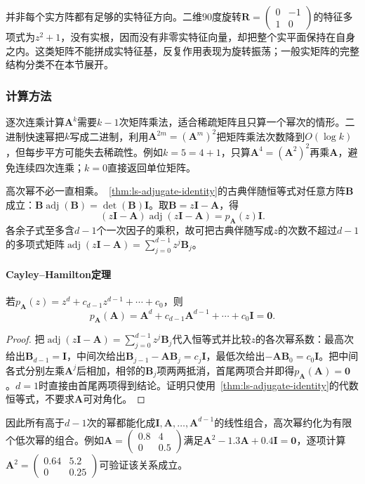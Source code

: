 并非每个实方阵都有足够的实特征方向。二维$90$度旋转$\bm R=\begin{pmatrix}0&-1\\1&0\end{pmatrix}$的特征多项式为$z^2+1$，没有实根，因而没有非零实特征向量，却把整个实平面保持在自身之内。这类矩阵不能拼成实特征基，反复作用表现为旋转振荡；一般实矩阵的完整结构分类不在本节展开。

\subsubsection{计算方法}

逐次连乘计算$\bm A^k$需要$k-1$次矩阵乘法，适合稀疏矩阵且只算一个幂次的情形。二进制快速幂把$k$写成二进制，利用$\bm A^{2m}=(\bm A^m)^2$把矩阵乘法次数降到$O(\log k)$，但每步平方可能失去稀疏性。例如$k=5=4+1$，只算$\bm A^4=(\bm A^2)^2$再乘$\bm A$，避免连续四次连乘；$k=0$直接返回单位矩阵。

高次幂不必一直相乘。~\ref{thm:ls-adjugate-identity}的古典伴随恒等式对任意方阵$\bm B$成立：$\bm B\operatorname{adj}(\bm B)=\det(\bm B)\bm I$。取$\bm B=z\bm I-\bm A$，得
\[
 (z\bm I-\bm A)\operatorname{adj}(z\bm I-\bm A)=p_{\bm A}(z)\bm I.
\]
各余子式至多含$d-1$个一次因子的乘积，故可把古典伴随写成$z$的次数不超过$d-1$的多项式矩阵$\operatorname{adj}(z\bm I-\bm A)=\sum_{j=0}^{d-1}z^j\bm B_j$。

\paragraph{Cayley--Hamilton定理}

\begin{theorem}
\label{thm:ls-cayley-hamilton}
若$p_{\bm A}(z)=z^d+c_{d-1}z^{d-1}+\cdots+c_0$，则
\[
 p_{\bm A}(\bm A)
 =\bm A^d+c_{d-1}\bm A^{d-1}+\cdots+c_0\bm I=\bm0.
\]
\end{theorem}
\begin{proof}
把$\operatorname{adj}(z\bm I-\bm A)=\sum_{j=0}^{d-1}z^j\bm B_j$代入恒等式并比较$z$的各次幂系数：最高次给出$\bm B_{d-1}=\bm I$，中间次给出$\bm B_{j-1}-\bm A\bm B_j=c_j\bm I$，最低次给出$-\bm A\bm B_0=c_0\bm I$。把中间各式分别左乘$\bm A^j$后相加，相邻的$\bm B_j$项两两抵消，首尾两项合并即得$p_{\bm A}(\bm A)=\bm0$。$d=1$时直接由首尾两项得到结论。证明只使用~\ref{thm:ls-adjugate-identity}的代数恒等式，不要求$\bm A$可对角化。
\end{proof}

因此所有高于$d-1$次的幂都能化成$\bm I,\bm A,\ldots,\bm A^{d-1}$的线性组合，高次幂约化为有限个低次幂的组合。例如$\bm A=\begin{pmatrix}0.8&4\\0&0.5\end{pmatrix}$满足$\bm A^2-1.3\bm A+0.4\bm I=\bm0$，逐项计算$\bm A^2=\begin{pmatrix}0.64&5.2\\0&0.25\end{pmatrix}$可验证该关系成立。

